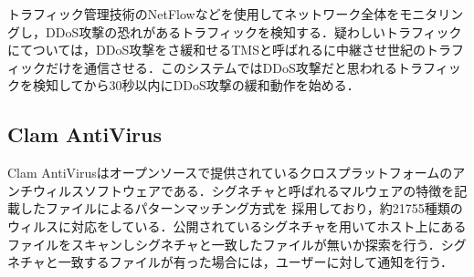 トラフィック管理技術のNetFlowなどを使用してネットワーク全体をモニタリングし，DDoS攻撃の恐れがあるトラフィックを検知する．疑わしいトラフィックにてついては，DDoS攻撃をさ緩和せるTMSと呼ばれるに中継させ世紀のトラフィックだけを通信させる．このシステムではDDoS攻撃だと思われるトラフィックを検知してから30秒以内にDDoS攻撃の緩和動作を始める．

\subsection{Clam AntiVirus\cite{ClamAV}}

Clam AntiVirusはオープンソースで提供されているクロスプラットフォームのアンチウィルスソフトウェアである．シグネチャと呼ばれるマルウェアの特徴を記載したファイルによるパターンマッチング方式を
採用しており，約21755種類のウィルスに対応をしている．公開されているシグネチャを用いてホスト上にあるファイルをスキャンしシグネチャと一致したファイルが無いか探索を行う．シグネチャと一致するファイルが有った場合には，ユーザーに対して通知を行う．
